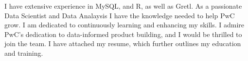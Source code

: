 



I have extensive experience in MySQL, and R, as well as Gretl. As a passionate Data Scientist and Data Analaysis I have the knowledge needed to help PwC grow. I am dedicated to continuously learning and enhancing my skills. I admire PwC’s dedication to data-informed product building, and I would be thrilled to join the team. I have attached my resume, which further outlines my education and training.


